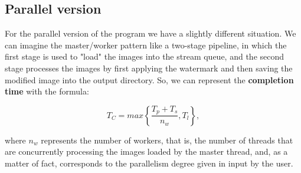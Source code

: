         \subsection{Parallel version} %
        \label{sub:parallel_version}
            For the parallel version of the program we have a slightly different situation. We can imagine the
            master/worker pattern like a two-stage pipeline, in which the first stage is used to "load" the images
            into the stream queue, and the second stage processes the images by first applying the watermark and
            then saving the modified image into the output directory. So, we can represent the
            \textbf{completion time} with the formula:

            \begin{equation}
                T_C = \mathit{max} \left \{ \frac{T_p + T_s}{n_w}, T_l \right \},
            \end{equation}

            where $n_w$ represents the number of workers, that is, the number of threads that are concurrently
            processing the images loaded by the master thread, and, as a matter of fact, corresponds to the
            parallelism degree given in input by the user.

